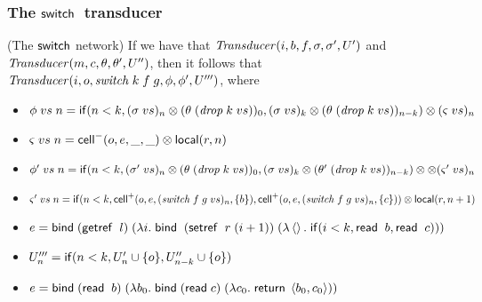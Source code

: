 \subsubsection{The $\mathsf{switch}\;$ transducer}
\begin{lemma}{(The $\mathsf{switch}$ network)}
If we have that $\mathit{Transducer}(i, b, f, \sigma, \sigma', U')$ and $\mathit{Transducer}(m, c, \theta, \theta', U'')$, 
then it follows that $\mathit{Transducer}(i, o, \mathit{switch}\;k\;f\;g, \phi, \phi', U''')$, where 

\begin{itemize}
\item $\phi\;vs\;n = \mathsf{if}({n < k}, {(\sigma\;vs)_n \otimes (\theta\;(\mathit{drop}\;k\;vs))_0}, {(\sigma\;vs)_k \otimes (\theta\;(\mathit{drop}\;k\;vs))_{n-k}}) \otimes (\varsigma\;vs)_n$
\item $\varsigma\;vs\;n = \mathsf{cell}^{-}({o}, {e}, {\_}, {\_}) \otimes \mathsf{local}({r}, {n})$ 
\item $\phi'\;vs\;n = \mathsf{if}({n < k}, {(\sigma'\;vs)_n \otimes (\theta\;(\mathit{drop}\;k\;vs))_0}, {(\sigma\;vs)_k \otimes (\theta'\;(\mathit{drop}\;k\;vs))_{n-k}}) \otimes  \otimes (\varsigma'\;vs)_n$
\item $\varsigma'\;vs\;n = \mathsf{if}({n < k}, {\mathsf{cell}^{+}({o}, {e}, {(\mathit{switch}\;f\;g\;vs)_n}, {\{{b}\}})}, {\mathsf{cell}^{+}({o}, {e}, {(\mathit{switch}\;f\;g\;vs)_n}, {\{{c}\}})}) \otimes \mathsf{local}({r}, {n+1})$
\item $e = \mathsf{bind}\; (\mathsf{getref}\;\;l)\;(\lambda i.\;\mathsf{bind}\;\;(\mathsf{setref}\;\;r\;(i+1))\; (\lambda \left<\right>.\;\mathsf{if}({i < k}, {\mathsf{read}\;\;b}, {\mathsf{read}\;\;c})))$
\item $U'''_n = \mathsf{if}({n < k}, {U'_n \cup \{{o}\}}, {U''_{n-k} \cup \{{o}\}})$
\item $e = \mathsf{bind}\; (\mathsf{read}\;\;b)\; (\lambda b_0.\;\mathsf{bind}\; (\mathsf{read}\; c)\;(\lambda c_0.\;\mathsf{return}\;\left<{b_0},{c_0}\right>))$
\end{itemize}
\end{lemma}
